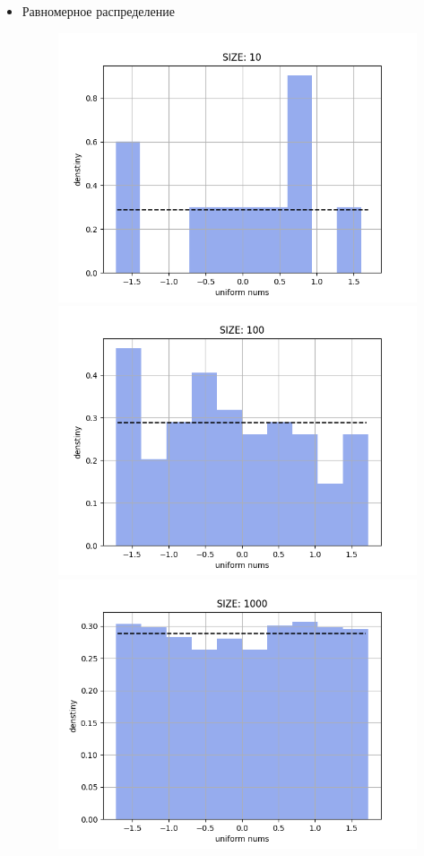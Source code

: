 \begin{itemize}
	\item{Равномерное распределение}
	\begin{figure}[H]
		\begin{center}
			\includegraphics[scale=0.333]{resources/uniform10.png}
			\includegraphics[scale=0.333]{resources/uniform100.png}
			\includegraphics[scale=0.333]{resources/uniform1000.png}

\end{center}
\end{figure}
\end{itemize}
